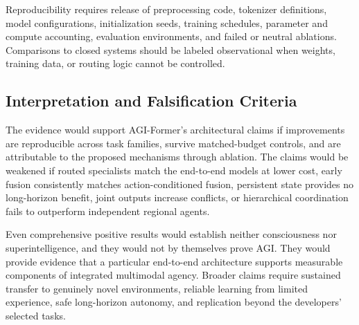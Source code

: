 Reproducibility requires release of preprocessing code, tokenizer definitions, model configurations, initialization seeds, training schedules, parameter and compute accounting, evaluation environments, and failed or neutral ablations. Comparisons to closed systems should be labeled observational when weights, training data, or routing logic cannot be controlled.

\subsection{\textbf{Interpretation and Falsification Criteria}}

The evidence would support AGI-Former's architectural claims if improvements are reproducible across task families, survive matched-budget controls, and are attributable to the proposed mechanisms through ablation. The claims would be weakened if routed specialists match the end-to-end models at lower cost, early fusion consistently matches action-conditioned fusion, persistent state provides no long-horizon benefit, joint outputs increase conflicts, or hierarchical coordination fails to outperform independent regional agents.

Even comprehensive positive results would establish neither consciousness nor superintelligence, and they would not by themselves prove AGI. They would provide evidence that a particular end-to-end architecture supports measurable components of integrated multimodal agency. Broader claims require sustained transfer to genuinely novel environments, reliable learning from limited experience, safe long-horizon autonomy, and replication beyond the developers' selected tasks.

